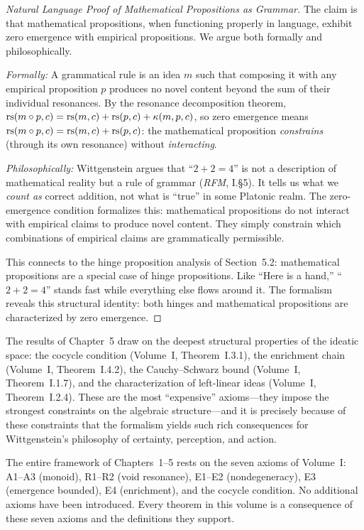 \begin{proof}[Natural Language Proof of Mathematical Propositions as Grammar]
The claim is that mathematical propositions, when functioning properly in
language, exhibit zero emergence with empirical propositions. We argue both
formally and philosophically.

\emph{Formally:} A grammatical rule is an idea $m$ such that composing it with
any empirical proposition $p$ produces no novel content beyond the sum of
their individual resonances. By the resonance decomposition theorem,
$\mathrm{rs}(m \circ p, c) = \mathrm{rs}(m, c) + \mathrm{rs}(p, c) + \kappa(m, p, c)$, so zero
emergence means $\mathrm{rs}(m \circ p, c) = \mathrm{rs}(m, c) + \mathrm{rs}(p, c)$: the mathematical
proposition \emph{constrains} (through its own resonance) without \emph{interacting}.

\emph{Philosophically:} Wittgenstein argues that ``$2 + 2 = 4$'' is not a description
of mathematical reality but a rule of grammar (\textit{RFM}, I.\S5). It tells us
what we \emph{count as} correct addition, not what is ``true'' in some Platonic realm.
The zero-emergence condition formalizes this: mathematical propositions do not
interact with empirical claims to produce novel content. They simply constrain
which combinations of empirical claims are grammatically permissible.

This connects to the hinge proposition analysis of Section~5.2: mathematical
propositions are a special case of hinge propositions. Like ``Here is a hand,''
``$2 + 2 = 4$'' stands fast while everything else flows around it. The
formalism reveals this structural identity: both hinges and mathematical
propositions are characterized by zero emergence.
\end{proof}

\begin{remark}
The results of Chapter~5 draw on the deepest structural properties of the
ideatic space: the cocycle condition (Volume~I, Theorem~I.3.1), the enrichment
chain (Volume~I, Theorem~I.4.2), the Cauchy--Schwarz bound (Volume~I,
Theorem~I.1.7), and the characterization of left-linear ideas (Volume~I,
Theorem~I.2.4). These are the most ``expensive'' axioms---they impose the
strongest constraints on the algebraic structure---and it is precisely because
of these constraints that the formalism yields such rich consequences for
Wittgenstein's philosophy of certainty, perception, and action.

The entire framework of Chapters~1--5 rests on the seven axioms of Volume~I:
A1--A3 (monoid), R1--R2 (void resonance), E1--E2 (nondegeneracy), E3 (emergence
bounded), E4 (enrichment), and the cocycle condition. No additional axioms have
been introduced. Every theorem in this volume is a consequence of these seven
axioms and the definitions they support.
\end{remark}

